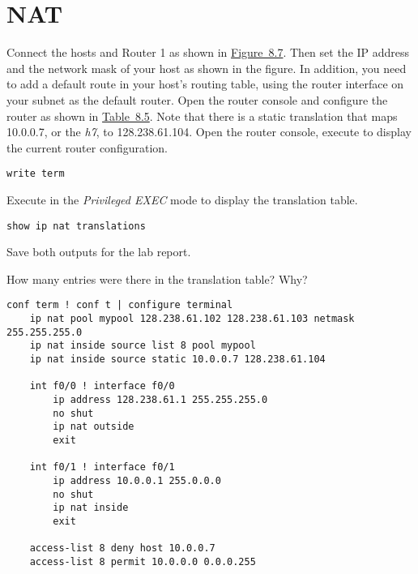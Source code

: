 \documentclass{../UTNetLab}
\begin{document}
\section{NAT}
Connect the hosts and Router 1 as shown in \hyperref[fig:8.7]{Figure~8.7}.
Then set the IP address and the network mask of your host as shown in the figure.
In addition, you need to add a default route in your host’s routing table, using the router interface on your subnet as the default router.
Open the router console and configure the router as shown in \hyperref[tab:8.5]{Table~8.5}.
Note that there is a static translation that maps 10.0.0.7, or the \textit{h7}, to 128.238.61.104.
Open the router console, execute  to display the current router configuration.

\begin{lstlisting}
write term
\end{lstlisting}

Execute  in the \textit{Privileged EXEC} mode to display the translation table.

\begin{lstlisting}
show ip nat translations
\end{lstlisting}

Save both outputs for the lab report.

\begin{report}
    \item How many entries were there in the translation table? Why?
\end{report}

\begin{minipage}{\linewidth}
\begin{lstlisting}[emph={mypool}, caption={NAT Router Configuration in \hyperref[fig:8.7]{Figure~8.7} (Table~8.5)\label{tab:8.5}}]
conf term ! conf t | configure terminal
    ip nat pool mypool 128.238.61.102 128.238.61.103 netmask 255.255.255.0
    ip nat inside source list 8 pool mypool
    ip nat inside source static 10.0.0.7 128.238.61.104

    int f0/0 ! interface f0/0
        ip address 128.238.61.1 255.255.255.0
        no shut
        ip nat outside
        exit

    int f0/1 ! interface f0/1
        ip address 10.0.0.1 255.0.0.0
        no shut
        ip nat inside
        exit

    access-list 8 deny host 10.0.0.7
    access-list 8 permit 10.0.0.0 0.0.0.255
    \end{lstlisting}
\end{minipage}
\end{document}
